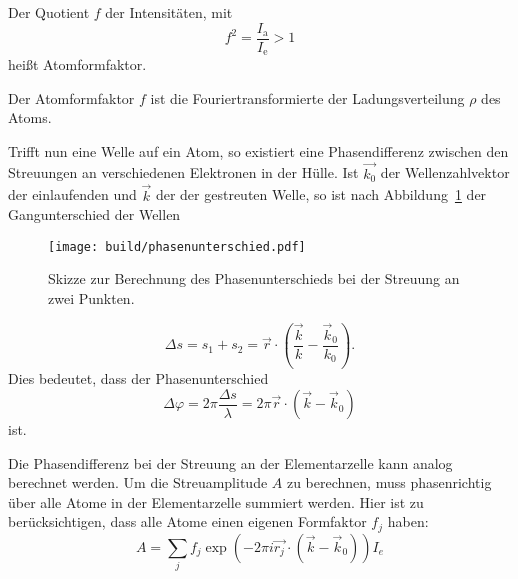 Der Quotient $f$ der Intensitäten, mit
\begin{equation}
  f^2 = \frac{I_\text{a}}{I_\text{e}} > 1
\end{equation}
heißt Atomformfaktor.

Der Atomformfaktor $f$ ist die Fouriertransformierte der Ladungsverteilung $\rho$ des Atoms.

Trifft nun eine Welle auf ein Atom, so existiert eine Phasendifferenz zwischen
den Streuungen an verschiedenen Elektronen in der Hülle.
Ist $\vec{k_0}$ der Wellenzahlvektor der einlaufenden und $\vec{k}$ der der gestreuten Welle,
so ist nach Abbildung~\ref{fig:phasenunterschied} der Gangunterschied der Wellen
\begin{figure}
  \centering
  \texttt{[image: build/phasenunterschied.pdf]}
  \caption{Skizze zur Berechnung des Phasenunterschieds bei der Streuung an zwei Punkten.\cite{anleitung}}%
  \label{fig:phasenunterschied}
\end{figure}
\begin{equation}
  \Delta s = s_1 + s_2 = \vec{r} \cdot \left(\frac{\vec{k}}{k} - \frac{\vec{k}_0}{k_0}\right).
\end{equation}
Dies bedeutet, dass der Phasenunterschied
\begin{equation}
  \Delta \varphi = 2 \pi \frac{\Delta s}{\lambda} = 2 \pi \vec{r} \cdot \left(\vec{k} - \vec{k}_0\right)
\end{equation}
ist.


Die Phasendifferenz bei der Streuung an der Elementarzelle kann analog berechnet werden.
Um die Streuamplitude $A$ zu berechnen, muss phasenrichtig über alle Atome
in der Elementarzelle summiert werden.
Hier ist zu berücksichtigen, dass alle Atome einen eigenen Formfaktor $f_j$ haben:
\begin{equation}
  A = \sum_j f_j \exp\left(-2\pi i \vec{r_j} \cdot\left(\vec{k} - \vec{k}_0 \right)\right) I_e
\end{equation}

